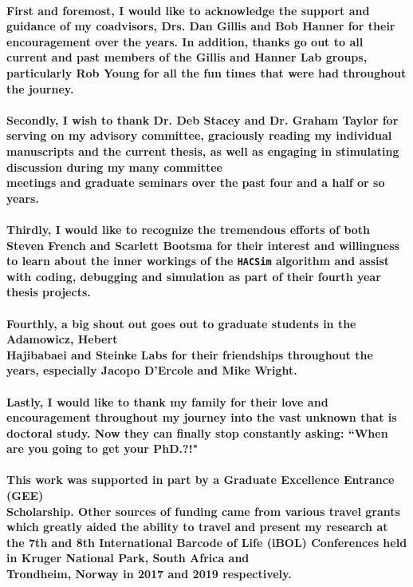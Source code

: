 \begin{acknowledgements}\label{acknow}
\ssp
\paragraph*{First and foremost, I would like to acknowledge the support and guidance of my coadvisors, Drs. Dan Gillis and Bob Hanner for their encouragement over the years. In addition, thanks go out to all current and past members of the Gillis and Hanner Lab groups, particularly Rob Young for all the fun times that were had throughout the journey.} 

\paragraph*{Secondly, I wish to thank Dr. Deb Stacey and Dr. Graham Taylor for serving on my advisory committee, graciously reading my individual manuscripts and the current thesis, as well as engaging in stimulating discussion during my many committee \\ meetings and graduate seminars over the past four and a half or so years.} 

\paragraph*{Thirdly, I would like to recognize the tremendous efforts of both Steven French and Scarlett Bootsma for their interest and willingness to learn about the inner workings of the {\tt HACSim} algorithm and assist with coding, debugging and simulation as part of their fourth year thesis projects.}

\paragraph*{Fourthly, a big shout out goes out to graduate students in the Adamowicz, Hebert \\ Hajibabaei and Steinke Labs for their friendships throughout the years, especially Jacopo D'Ercole and Mike Wright.}

\paragraph*{Lastly, I would like to thank my family for their love and encouragement throughout my journey into the vast unknown that is doctoral study. Now they can finally stop constantly asking: ``When are you going to get your PhD.?!"}

\paragraph*{This work was supported in part by a Graduate Excellence Entrance (GEE) \\ Scholarship. Other sources of funding came from various travel grants which greatly aided the ability to travel and present my research at the 7th and 8th International Barcode of Life (iBOL) Conferences held in Kruger National Park, South Africa and \\ Trondheim, Norway in 2017 and 2019 respectively.}


\end{acknowledgements}
\dsp
